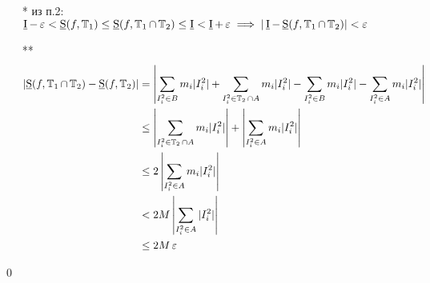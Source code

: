 \documentclass[a4paper, 10pt]{article}
\begin{document}
\begin{itemize}
    \item[*] из п.2: $\operatorname{\underline{I}} - \operatorname{\varepsilon} < \operatorname{\underline{S}}(f, \operatorname{\mathbb{T}}_1) \le \operatorname{\underline{S}}(f, \operatorname{\mathbb{T}}_1\cap \operatorname{\mathbb{T}}_2) \le \operatorname{\underline{I}} < \operatorname{\underline{I}} + \operatorname{\varepsilon} \implies |\operatorname{\underline{I}} - \operatorname{\underline{S}}(f, \operatorname{\mathbb{T}}_1\cap\operatorname{\mathbb{T}}_2)| < \operatorname{\varepsilon}$\\
    \item[**] \begin{equation*}
        \begin{aligned}
            \left|\us(f, \T_1\cap\T_2) - \us(f, \T_2)\right| &= \left|\sum_{I_i^2\in B}m_i|I_i^2| + \sum_{I_i^2\in \T_2\cap A}m_i|I_i^2| - \sum_{I_i^2\in B}m_i|I_i^2| - \sum_{I_i^2\in A}m_i|I_i^2|\right|\\
            &\le \left|\sum_{I_i^2\in \T_2\cap A}m_i|I_i^2|\right| + \left|\sum_{I_i^2\in A}m_i|I_i^2|\right|\\
            &\le 2\left|\sum_{I_i^2\in A}m_i|I_i^2|\right|\\
            &< 2M\left|\sum_{I_i^2\in A}|I_i^2|\right|\\
            &\le 2M\ve
        \end{aligned}
    \end{equation*}
\end{itemize}\qed
\end{document}
